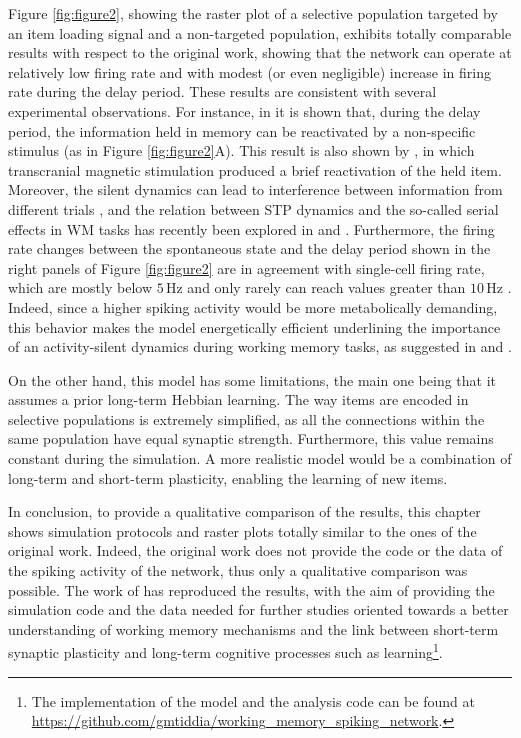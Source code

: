 \documentclass[a4paper, 12pt, twoside, openright]{book}
\begin{document}
Figure \ref{fig:figure2}, showing the raster plot of a selective population targeted by an item loading signal and a non-targeted population, exhibits totally comparable results with respect to the original work, showing that the network can operate at relatively low firing rate and with modest (or even negligible) increase in firing rate during the delay period. These results are consistent with several experimental observations. For instance, in \cite{Wolff2015, Wolff2017} it is shown that, during the delay period, the information held in memory can be reactivated by a non-specific stimulus (as in Figure \ref{fig:figure2}A). This result is also shown by \cite{Rose2016}, in which transcranial magnetic stimulation produced a brief reactivation of the held item. Moreover, the silent dynamics can lead to interference between information from different trials \cite{Kilpatrick2018}, and the relation between STP dynamics and the so-called serial effects in WM tasks has recently been explored in \cite{Kiyonaga2017} and \cite{Barbosa2020}. Furthermore, the firing rate changes between the spontaneous state and the delay period shown in the right panels of Figure \ref{fig:figure2} are in agreement with single-cell firing rate, which are mostly below $5$\,Hz and only rarely can reach values greater than $10$\,Hz \cite{Shafi2007}. Indeed, since a higher spiking activity would be more metabolically demanding, this behavior makes the model energetically efficient underlining the importance of an activity-silent dynamics during working memory tasks, as suggested in \cite{Attwell2001} and \cite{Lennie2003}.

On the other hand, this model has some limitations, the main one being that it assumes a prior long-term Hebbian learning. The way items are encoded in selective populations is extremely simplified, as all the connections within the same population have equal synaptic strength. Furthermore, this value remains constant during the simulation. A more realistic model would be a combination of long-term and short-term plasticity, enabling the learning of new items.


In conclusion, to provide a qualitative comparison of the results, this chapter shows simulation protocols and raster plots totally similar to the ones of the original work. Indeed, the original work does not provide the code or the data of the spiking activity of the network, thus only a qualitative comparison was possible. The work of \cite{Tiddia2022_WM} has reproduced the results, with the aim of providing the simulation code and the data needed for further studies oriented towards a better understanding of working memory mechanisms and the link between short-term synaptic plasticity and long-term cognitive processes such as learning\footnote{The implementation of the model and the analysis code can be found at \url{https://github.com/gmtiddia/working_memory_spiking_network}.}.
\end{document}
